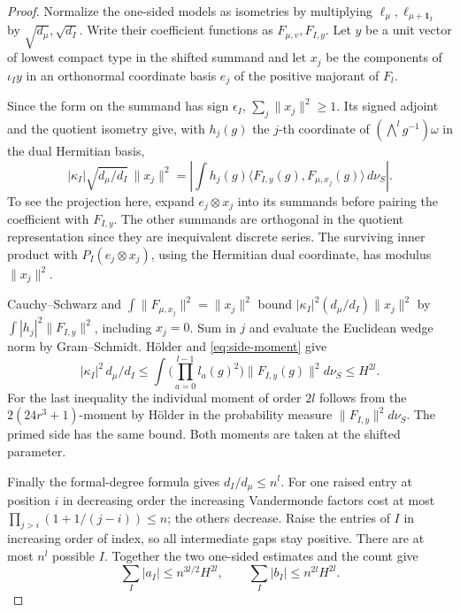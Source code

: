 \begin{proof}
Normalize the one-sided models as isometries by multiplying
\(\ell_\mu,\ell_{\mu+\mathbf1_I}\) by \(\sqrt{d_\mu},\sqrt{d_I}\).
Write their coefficient functions as \(F_{\mu,v},F_{I,y}\).
Let \(y\) be a unit vector of lowest compact type in the shifted
summand and let \(x_j\) be the components of \(\iota_I y\) in an
orthonormal coordinate basis \(e_j\) of the positive majorant of
\(F_l\).

Since the form on the summand has sign \(\epsilon_I\),
\(\sum_j\|x_j\|^2\ge1\). Its signed adjoint and the quotient
isometry give, with \(h_j(g)\) the \(j\)-th coordinate of
\((\bigwedge^l g^{-1})\omega\) in the dual Hermitian basis,
\[
 |\kappa_I|\sqrt{d_\mu/d_I}\,\|x_j\|^2
  =\left|\int h_j(g)\langle F_{I,y}(g),F_{\mu,x_j}(g)\rangle\,d\nu_S\right|.
\]
To see the projection here, expand \(e_j\otimes x_j\) into its
summands before pairing the coefficient with \(F_{I,y}\). The
other summands are orthogonal in the quotient representation since
they are inequivalent discrete series. The surviving inner product
with \(P_I(e_j\otimes x_j)\), using the Hermitian dual coordinate,
has modulus \(\|x_j\|^2\).

Cauchy--Schwarz and \(\int\|F_{\mu,x_j}\|^2=\|x_j\|^2\) bound
\(|\kappa_I|^2(d_\mu/d_I)\|x_j\|^2\) by
\(\int |h_j|^2\|F_{I,y}\|^2\), including \(x_j=0\).
Sum in \(j\) and evaluate the Euclidean wedge norm by
Gram--Schmidt. H\"older and \eqref{eq:side-moment} give
\[
 |\kappa_I|^2\,d_\mu/d_I
 \le \int\!\Big(\prod_{a=0}^{l-1}l_a(g)^2\Big)\|F_{I,y}(g)\|^2d\nu_S
 \le H^{2l}.
\]
For the last inequality the individual moment of order \(2l\)
follows from the \(2(24r^3+1)\)-moment by H\"older in the
probability measure \(\|F_{I,y}\|^2d\nu_S\). The primed side has
the same bound. Both moments are taken at the shifted parameter.

Finally the formal-degree formula gives \(d_I/d_\mu\le n^l\).
For one raised entry at position \(i\) in decreasing order the
increasing Vandermonde factors cost at most
\(\prod_{j>i}(1+1/(j-i))\le n\); the others decrease. Raise the
entries of \(I\) in increasing order of index, so all intermediate
gaps stay positive. There are at most \(n^l\) possible \(I\).
Together the two one-sided estimates and the count give
\[
 \sum_I|a_I|\le n^{3l/2}H^{2l},\qquad
 \sum_I|b_I|\le n^{2l}H^{2l}.
\]
\end{proof}

